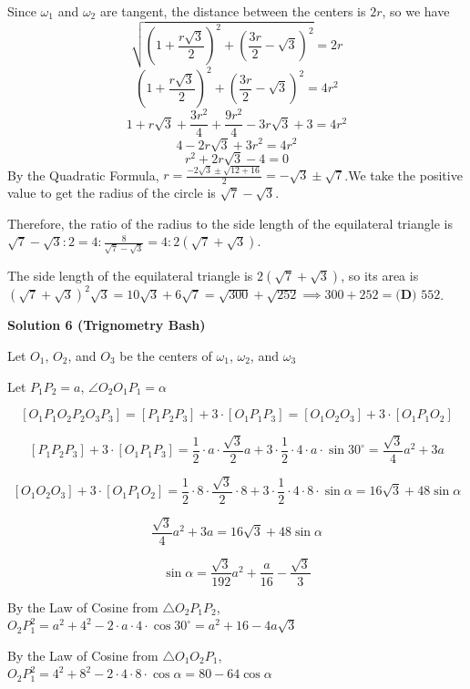 \begin{enumerate}
 Since $\omega_1$ and $\omega_2$ are tangent, the distance between the centers is $2r$, so we have
 \[\sqrt{\left(1 + \frac{r\sqrt{3}}{2}\right)^2 + \left(\frac{3r}{2} - \sqrt{3}\right)^2} = 2r\]
 \[\left(1 + \frac{r\sqrt{3}}{2}\right)^2 + \left(\frac{3r}{2} - \sqrt{3}\right)^2 = 4r^2\]
 \[1 + r\sqrt{3} + \frac{3r^2}{4} + \frac{9r^2}{4} - 3r\sqrt{3} + 3 = 4r^2\]
 \[4 - 2r\sqrt{3} + 3r^2 = 4r^2\]
 \[r^2 + 2r\sqrt{3} - 4 = 0\]By the Quadratic Formula, $r = \frac{-2\sqrt{3} \pm \sqrt{12 + 16}}{2} = -\sqrt{3}\pm\sqrt{7}$.We take the positive value to get the radius of the circle is $\sqrt{7} - \sqrt{3}$.

 Therefore, the ratio of the radius to the side length of the equilateral triangle is $\sqrt{7} - \sqrt{3} : 2 = 4 : \frac{8}{\sqrt{7} - \sqrt{3}} = 4 : 2(\sqrt{7} + \sqrt{3})$. 

 The side length of the equilateral triangle is $2(\sqrt{7} + \sqrt{3})$, so its area is $(\sqrt{7} + \sqrt{3})^2\sqrt{3} = 10\sqrt{3} + 6\sqrt{7} = \sqrt{300} + \sqrt{252} \implies 300 + 252 = \boxed{\textbf{(D) }552}$.

 



\textbf{Solution 6 (Trignometry Bash)}

Let $O_1$, $O_2$, and $O_3$ be the centers of $\omega_1$, $\omega_2$, and $\omega_3$

 Let $P_1P_2 = a$, $\angle O_2O_1P_1= \alpha$

 \[[O_1P_1O_2P_2O_3P_3] = [P_1P_2P_3] + 3 \cdot [O_1P_1P_3] = [O_1O_2O_3] + 3 \cdot [O_1P_1O_2]\]

 \[[P_1P_2P_3] + 3 \cdot [O_1P_1P_3] = \frac12 \cdot a \cdot \frac{ \sqrt{3} }{2} a + 3 \cdot \frac12 \cdot 4 \cdot a \cdot \sin 30^{\circ} = \frac{ \sqrt{3} }{4} a^2 + 3a\]

 \[[O_1O_2O_3] + 3 \cdot [O_1P_1O_2] = \frac12 \cdot 8 \cdot \frac{ \sqrt{3} }{2} \cdot 8 + 3 \cdot \frac12 \cdot 4 \cdot 8 \cdot \sin \alpha = 16 \sqrt{3} + 48 \sin \alpha\]

 \[\frac{ \sqrt{3} }{4} a^2 + 3a = 16 \sqrt{3} + 48 \sin \alpha\]

 \[\sin \alpha = \frac{ \sqrt{3} }{192} a^2 + \frac{a}{16} - \frac{ \sqrt{3} }{3}\]

 By the Law of Cosine from $\triangle O_2P_1P_2$, $O_2P_1^2 = a^2 + 4^2 - 2 \cdot a \cdot 4 \cdot \cos 30^{\circ} = a^2 + 16 - 4a \sqrt{3}$

 By the Law of Cosine from $\triangle O_1O_2P_1$, $O_2P_1^2 = 4^2 + 8 ^ 2 - 2 \cdot 4 \cdot 8 \cdot \cos \alpha = 80 - 64 \cos \alpha$


\end{enumerate}
